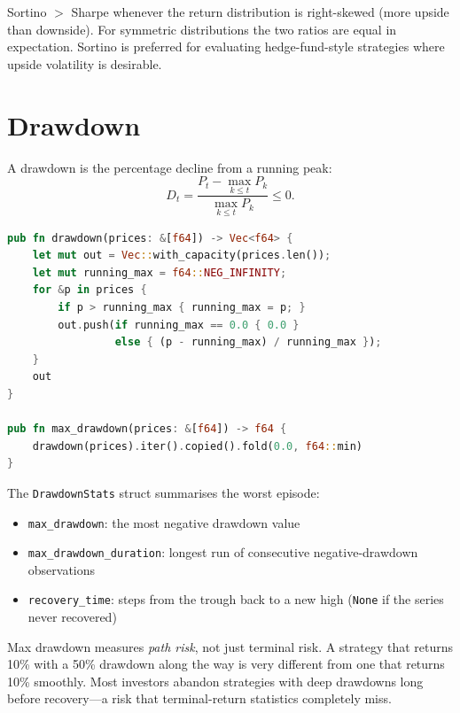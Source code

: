 \begin{keyinsight}
Sortino $>$ Sharpe whenever the return distribution is right-skewed (more
upside than downside). For symmetric distributions the two ratios are equal in
expectation. Sortino is preferred for evaluating hedge-fund-style strategies
where upside volatility is desirable.
\end{keyinsight}

\section{Drawdown}

A drawdown is the percentage decline from a running peak:
\[
D_t = \frac{P_t - \max_{k \le t} P_k}{\max_{k \le t} P_k} \le 0.
\]


\begin{lstlisting}[language=Rust]
pub fn drawdown(prices: &[f64]) -> Vec<f64> {
    let mut out = Vec::with_capacity(prices.len());
    let mut running_max = f64::NEG_INFINITY;
    for &p in prices {
        if p > running_max { running_max = p; }
        out.push(if running_max == 0.0 { 0.0 }
                 else { (p - running_max) / running_max });
    }
    out
}

pub fn max_drawdown(prices: &[f64]) -> f64 {
    drawdown(prices).iter().copied().fold(0.0, f64::min)
}
\end{lstlisting}

The \texttt{DrawdownStats} struct summarises the worst episode:
\begin{itemize}
    \item \texttt{max\_drawdown}: the most negative drawdown value
    \item \texttt{max\_drawdown\_duration}: longest run of consecutive
      negative-drawdown observations
    \item \texttt{recovery\_time}: steps from the trough back to a new high
      (\texttt{None} if the series never recovered)
\end{itemize}

\begin{keyinsight}
Max drawdown measures \emph{path risk}, not just terminal risk. A strategy
that returns 10\% with a 50\% drawdown along the way is very different from one
that returns 10\% smoothly. Most investors abandon strategies with deep
drawdowns long before recovery---a risk that terminal-return statistics
completely miss.
\end{keyinsight}

